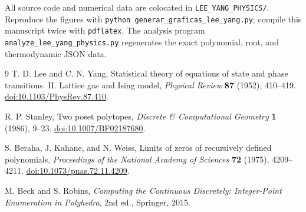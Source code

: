 \documentclass[11pt]{article}
\begin{document}
All source code and numerical data are colocated in \texttt{LEE\_YANG\_PHYSICS/}. Reproduce the figures with \texttt{python generar\_graficas\_lee\_yang.py}; compile this manuscript twice with \texttt{pdflatex}. The analysis program \texttt{analyze\_lee\_yang\_physics.py} regenerates the exact polynomial, root, and thermodynamic JSON data.

\begin{thebibliography}{9}
T. D. Lee and C. N. Yang,
Statistical theory of equations of state and phase transitions. II. Lattice gas and Ising model,
\emph{Physical Review} \textbf{87} (1952), 410--419.
\href{https://doi.org/10.1103/PhysRev.87.410}{doi:10.1103/PhysRev.87.410}.

R. P. Stanley,
Two poset polytopes,
\emph{Discrete \& Computational Geometry} \textbf{1} (1986), 9--23.
\href{https://doi.org/10.1007/BF02187680}{doi:10.1007/BF02187680}.

S. Beraha, J. Kahane, and N. Weiss,
Limits of zeros of recursively defined polynomials,
\emph{Proceedings of the National Academy of Sciences} \textbf{72} (1975), 4209--4211.
\href{https://doi.org/10.1073/pnas.72.11.4209}{doi:10.1073/pnas.72.11.4209}.

M. Beck and S. Robins,
\emph{Computing the Continuous Discretely: Integer-Point Enumeration in Polyhedra},
2nd ed., Springer, 2015.
\end{thebibliography}
\end{document}
